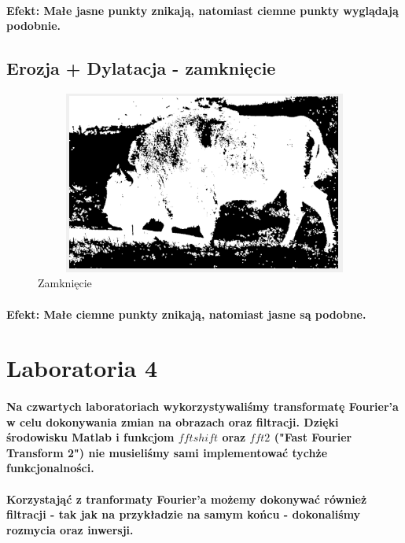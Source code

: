 \documentclass[a4paper,12pt]{article}
\begin{document}
\begin{justify}
\paragraph{Efekt: Małe jasne punkty znikają, natomiast ciemne punkty wyglądają podobnie.}

\newpage

\subsection{Erozja + Dylatacja - zamknięcie}

\begin{figure}[h!]
\centering
\includegraphics[width=12cm, height=6cm]{14}
\caption{Zamknięcie}
\end{figure}

\paragraph{Efekt: Małe ciemne punkty znikają, natomiast jasne są podobne.}

\newpage

\section{Laboratoria 4}

\paragraph{Na czwartych laboratoriach wykorzystywaliśmy transformatę Fourier'a w celu dokonywania zmian na obrazach oraz filtracji. Dzięki środowisku Matlab i funkcjom $fftshift$ oraz $fft2$ ("Fast Fourier Transform 2") nie musieliśmy sami implementować tychże funkcjonalności.}

\paragraph{Korzystająć z tranformaty Fourier'a możemy dokonywać również filtracji - tak jak na przykładzie na samym końcu - dokonaliśmy rozmycia oraz inwersji.}


\end{justify}
\end{document}
